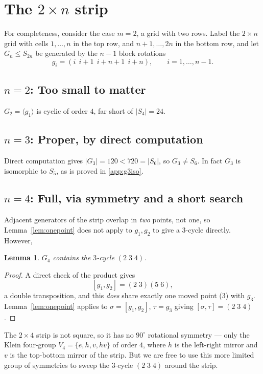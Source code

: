\documentclass[11pt]{article}
\newtheorem{lemma}{Lemma}
\begin{document}
\section{The $2\times n$ strip}

For completeness, consider the case $m=2$, a grid with two rows. Label the $2\times n$ grid with cells $1,\dots,n$ in the top row, and $n{+}1,\dots,2n$ in the bottom row, and let $G_n \le S_{2n}$ be generated by the $n-1$ block rotations
\[
g_i = (i\;\,i{+}1\;\,i{+}n{+}1\;\,i{+}n), \qquad i = 1,\dots,n-1.
\]

\subsection*{$n=2$: Too small to matter}
$G_2 = \langle g_1\rangle$ is cyclic of order $4$, far short of $|S_4|=24$.

\subsection*{$n=3$: Proper, by direct computation}
Direct computation gives $|G_3| = 120 < 720 = |S_6|$, so $G_3 \neq S_6$. In fact $G_3$ is isomorphic to $S_5$, as is proved in \ref{app:g3iso}.

\subsection*{$n=4$: Full, via symmetry and a short search}

Adjacent generators of the strip overlap in \emph{two} points, not one, so Lemma~\ref{lem:onepoint} does not apply to $g_1,g_2$ to give a $3$-cycle directly. However, 

\begin{lemma}\label{lem:strip3cycle}
$G_4$ contains the $3$-cycle $(2\;3\;4)$.
\end{lemma}
\begin{proof}
A direct check of the product gives
\[
[g_1,g_2] = (2\;3)(5\;6),
\]
a double transposition, and this \emph{does} share exactly one moved point (3) with $g_3$. Lemma~\ref{lem:onepoint} applies to $\sigma=[g_1,g_2]$, $\tau=g_3$ giving $[\sigma,\tau]=(2\;3\;4)$.
\end{proof}

The $2\times4$ strip is not square, so it has no $90^\circ$ rotational symmetry — only the Klein four-group $V_4=\{e,h,v,hv\}$ of order $4$, where $h$ is the left-right mirror and $v$ is the top-bottom mirror of the strip. But we are free to use this more limited group of symmetries to sweep the $3$-cycle $(2\;3\;4)$ around the strip.
\end{document}
